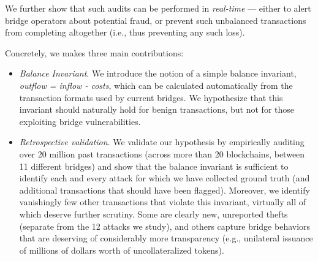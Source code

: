 We further show that such audits can be performed in \emph{real-time}
--- either to alert bridge operators about potential fraud, or prevent
such unbalanced transactions from completing altogether (i.e., thus
preventing any such loss).


Concretely, we makes three main contributions:
\begin{itemize}
\item\emph{Balance Invariant}.  We introduce the notion of a simple
  balance invariant, \emph{outflow = inflow - costs}, which can be
  calculated automatically from the transaction formats used by
  current bridges.  We hypothesize that this invariant should naturally hold for benign
  transactions, but not for those exploiting bridge vulnerabilities.

\item\emph{Retrospective validation}.  We validate our hypothesis by
  empirically auditing over 20 million past transactions (across more
  than 20 blockchains, between 11 different bridges) and show that the
  balance invariant is sufficient to identify each and every attack
  for which we have collected ground truth (and additional transactions that should have been flagged).  Moreover, we identify
  vanishingly few other transactions that violate this invariant,
  virtually all of which deserve further scrutiny. Some are clearly new, unreported thefts (separate from the 12 attacks we study), and others capture bridge behaviors that are deserving of considerably more transparency (e.g., unilateral issuance of millions of dollars worth of uncollateralized tokens).
  


\end{itemize}
